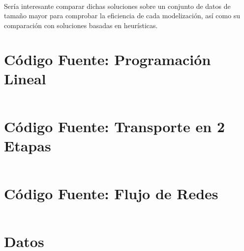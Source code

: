 \documentclass{article}
\begin{document}
    \paragraph{}
    Sería interesante comparar dichas soluciones sobre un conjunto de datos de tamaño mayor para comprobar la eficiencia de cada modelización, así como su comparación con soluciones basadas en heurísticas.

  \begin{appendices}

    \section{Código Fuente: Programación Lineal}
    \label{appendix:source-code-linear-programmming}

      \inputminted{text}{./../mosel/linear-programming-model.mos}

    \section{Código Fuente: Transporte en 2 Etapas}
    \label{appendix:source-code-transportation}

      \inputminted{text}{./../mosel/two-steps-transportation-model.mos}

    \section{Código Fuente: Flujo de Redes}
    \label{appendix:source-code-network-flow}

      \inputminted{text}{./../mosel/network-flow-model.mos}

    \section{Datos}
    \label{appendix:data}

      \inputminted{text}{./../mosel/data.dat}

  \end{appendices}






  \nocite{subject:pent2017}
  \nocite{tool:xpress-mosel}
  \nocite{repository:network-flow-transeuro}

  
  
\end{document}
